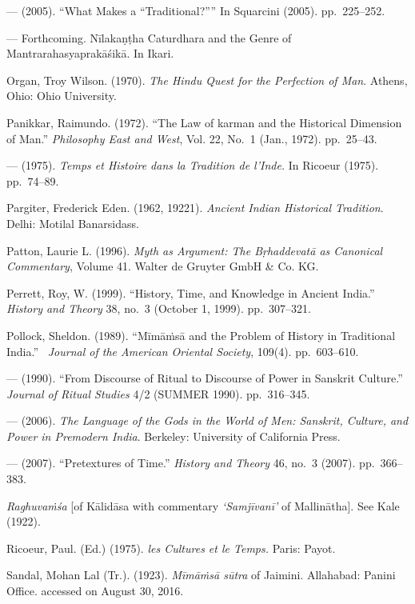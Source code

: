 \begin{thebibliography}{99}
  --- (2005). “What Makes a “Traditional?”” In Squarcini (2005). pp.~225--252.

  --- Forthcoming. Nīlakaṇṭha Caturdhara and the Genre of Mantrarahasyaprakāśikā. In Ikari.

  Organ, Troy Wilson. (1970). \textit{The Hindu Quest for the Perfection of Man}. Athens, Ohio: Ohio University.

  Panikkar, Raimundo. (1972). “The Law of karman and the Historical Dimension of Man.” \textit{Philosophy East and West}, Vol. 22, No.~1 (Jan., 1972). pp.~25--43.

  --- (1975). \textit{Temps et Histoire dans la Tradition de l’Inde.} In Ricoeur (1975). pp.~74--89.

  Pargiter, Frederick Eden. (1962, 19221). \textit{Ancient Indian Historical Tradition}. Delhi: Motilal Banarsidass.

  Patton, Laurie L. (1996). \textit{Myth as Argument: The Bṛhaddevatā as Canonical Commentary}, Volume 41. Walter de Gruyter GmbH \& Co. KG.

  Perrett, Roy, W. (1999). “History, Time, and Knowledge in Ancient India.” \textit{History and Theory} 38, no.~3 (October 1, 1999). pp.~307--321.

  Pollock, Sheldon. (1989). “Mīmāṁsā and the Problem of History in Traditional India.”  \textit{Journal of the American Oriental Society}, 109(4). pp.~603--610.

  --- (1990). “From Discourse of Ritual to Discourse of Power in Sanskrit Culture.” \textit{Journal of Ritual Studies} 4/2 (SUMMER 1990). pp.~316--345.

  --- (2006). \textit{The Language of the Gods in the World of Men: Sanskrit, Culture, and Power in Premodern India}. Berkeley: University of California Press.

  --- (2007). “Pretextures of Time.” \textit{History and Theory} 46, no.~3 (2007). pp.~366--383.

  \textit{Raghuvaṁśa} [of Kālidāsa with commentary \textit{‘Samjīvanī’} of Mallinātha]. See Kale (1922).

  Ricoeur, Paul. (Ed.) (1975). \textit{les Cultures et le Temps.} Paris: Payot.

  Sandal, Mohan Lal (Tr.). (1923). \textit{Mīmāṁsā sūtra} of Jaimini. Allahabad: Panini Office. accessed on August 30, 2016.


\end{thebibliography}
